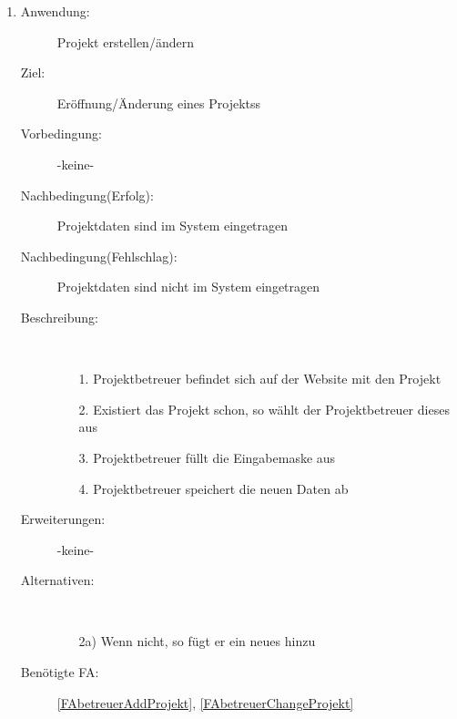 \documentclass[parskip=full]{scrartcl}
\newcommand{\swtLabel}[1]{\textbf{/#1\arabic*0/}}
\begin{document}
\begin{enumerate} [label=\swtLabel{B}]
  
  \item \label{UCbetreuerThemaErstellenÄndern}
	\begin{description}
  		\item[Anwendung:] \gls{Projekt} erstellen/ändern
  		\item[Ziel:] Eröffnung/Änderung eines \glspl{Projekt}s
  		\item[Vorbedingung:] -keine-
  		\item[Nachbedingung(Erfolg):] \gls{Projekt}daten sind im System eingetragen
  		\item[Nachbedingung(Fehlschlag):] \gls{Projekt}daten sind nicht im System
  		eingetragen
  		\item[Beschreibung:]~
  	\begin{enumerate}
  	  \item[1.] \gls{Projektbetreuer} befindet sich auf der Website mit den \gls{Projekt}
  	  \item[2.] Existiert das \gls{Projekt} schon, so wählt der \gls{Projektbetreuer} dieses aus
  	  \item[3.] \gls{Projektbetreuer} füllt die Eingabemaske aus
  	  \item[4.] \gls{Projektbetreuer} speichert die neuen Daten ab
  	\end{enumerate}
  	\item[Erweiterungen:] -keine-
  	\item[Alternativen:]~
  	\begin{enumerate}
  	  \item[2a)] Wenn nicht, so fügt er ein neues hinzu
  	\end{enumerate}  
  	\item[Benötigte FA:] \ref{FAbetreuerAddProjekt}, \ref{FAbetreuerChangeProjekt}
  \end{description}


\end{enumerate}
\end{document}
